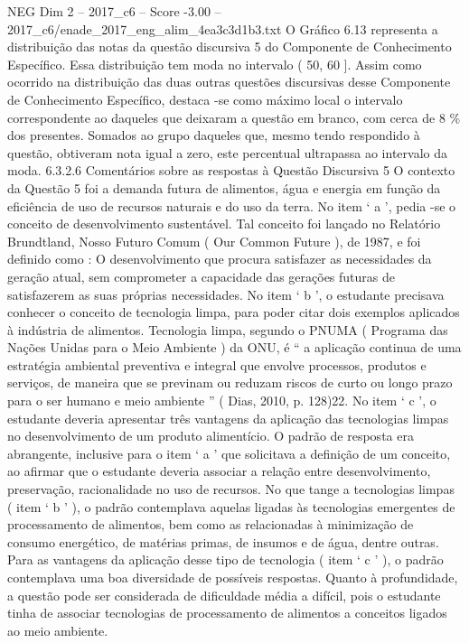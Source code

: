 \begin{textsample}{NEG Dim 2 – 2017\_c6 – Score -3.00 – 2017\_c6/enade\_2017\_eng\_alim\_4ea3c3d1b3.txt}
O Gráfico 6.13 representa a distribuição das notas da questão discursiva 5 do Componente de Conhecimento Específico.
Essa distribuição tem moda no intervalo ( 50, 60 ].
Assim como ocorrido na distribuição das duas outras questões discursivas desse Componente de Conhecimento Específico, destaca -se como máximo local o intervalo correspondente ao daqueles que deixaram a questão em branco, com cerca de 8 \% dos presentes.
Somados ao grupo daqueles que, mesmo tendo respondido à questão, obtiveram nota igual a zero, este percentual ultrapassa ao intervalo da moda. 6.3.2.6 Comentários sobre as respostas à Questão Discursiva 5 O contexto da Questão 5 foi a demanda futura de alimentos, água e energia em função da eficiência de uso de recursos naturais e do uso da terra.
No item ‘ a ’, pedia -se o conceito de desenvolvimento sustentável.
Tal conceito foi lançado no Relatório Brundtland, Nosso Futuro Comum ( Our Common Future ), de 1987, e foi definido como : O desenvolvimento que procura satisfazer as necessidades da geração atual, sem comprometer a capacidade das gerações futuras de satisfazerem as suas próprias necessidades.
No item ‘ b ’, o estudante precisava conhecer o conceito de tecnologia limpa, para poder citar dois exemplos aplicados à indústria de alimentos.
Tecnologia limpa, segundo o PNUMA ( Programa das Nações Unidas para o Meio Ambiente ) da ONU, é “ a aplicação continua de uma estratégia ambiental preventiva e integral que envolve processos, produtos e serviços, de maneira que se previnam ou reduzam riscos de curto ou longo prazo para o ser humano e meio ambiente ” ( Dias, 2010, p. 128)22.
No item ‘ c ’, o estudante deveria apresentar três vantagens da aplicação das tecnologias limpas no desenvolvimento de um produto alimentício.
O padrão de resposta era abrangente, inclusive para o item ‘ a ’ que solicitava a definição de um conceito, ao afirmar que o estudante deveria associar a relação entre desenvolvimento, preservação, racionalidade no uso de recursos.
No que tange a tecnologias limpas ( item ‘ b ’ ), o padrão contemplava aquelas ligadas às tecnologias emergentes de processamento de alimentos, bem como as relacionadas à minimização de consumo energético, de matérias primas, de insumos e de água, dentre outras.
Para as vantagens da aplicação desse tipo de tecnologia ( item ‘ c ’ ), o padrão contemplava uma boa diversidade de possíveis respostas.
Quanto à profundidade, a questão pode ser considerada de dificuldade média a difícil, pois o estudante tinha de associar tecnologias de processamento de alimentos a conceitos ligados ao meio ambiente.

\end{textsample}
